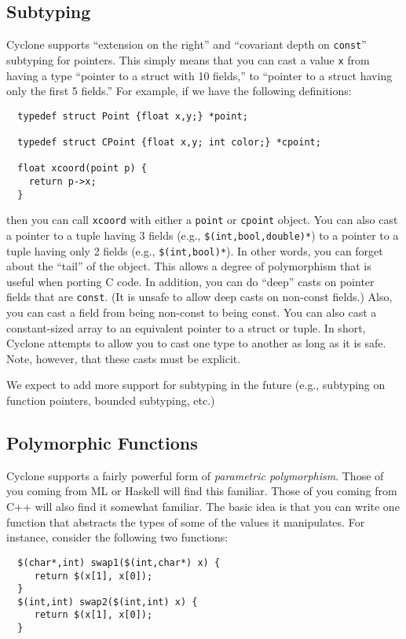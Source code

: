 \subsection{Subtyping}
Cyclone supports ``extension on the right'' and ``covariant depth on
\texttt{const}'' subtyping for pointers.  This simply means that you
can cast a value \texttt{x} from having a type ``pointer to a struct
with 10 fields,'' to ``pointer to a struct having only the first 5
fields.''  For example, if we have the following definitions:
\begin{verbatim}
  typedef struct Point {float x,y;} *point;

  typedef struct CPoint {float x,y; int color;} *cpoint;

  float xcoord(point p) {
    return p->x;
  }
\end{verbatim}
then you can call \texttt{xcoord} with either a \texttt{point} or
\texttt{cpoint} object.  You can also cast a pointer to a tuple having 3
fields (e.g., \texttt{\$(int,bool,double)*}) to a pointer to a tuple
having only 2 fields (e.g., \texttt{\$(int,bool)*}).  In other words, you
can forget about the ``tail'' of the object.  This allows a degree of
polymorphism that is useful when porting C code.  In addition, you can
do ``deep'' casts on pointer fields that are \texttt{const}.  (It is
unsafe to allow deep casts on non-const fields.)  Also, you can cast
a field from being non-const to being const.  You can also cast a
constant-sized array to an equivalent pointer to a struct or tuple.
In short, Cyclone attempts to allow you to cast one type to another as
long as it is safe.  Note, however, that these casts must be explicit.

We expect to add more support for subtyping in the future (e.g.,
subtyping on function pointers, bounded subtyping, etc.)

\subsection{Polymorphic Functions}
\label{sec:polyfun}

Cyclone supports a fairly powerful form of \emph{parametric
polymorphism}.  Those of you coming from ML or Haskell will find this
familiar.  Those of you coming from C++ will also find it somewhat
familiar.  The basic idea is that you can write one function that
abstracts the types of some of the values it manipulates.  For
instance, consider the following two functions:
\begin{verbatim}
  $(char*,int) swap1($(int,char*) x) {
     return $(x[1], x[0]);
  }
  $(int,int) swap2($(int,int) x) {
     return $(x[1], x[0]);
  }
\end{verbatim}

